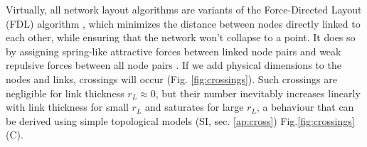\documentclass[nofootinbib,preprint,floatfix,endfloats]{revtex4} %
\begin{document}
Virtually, all network layout algorithms are variants of the Force-Directed Layout (FDL) algorithm \cite{kamada1989algorithm,davidson1996drawing,fruchterman1991graph,barnes1986hierarchical}, which minimizes the distance between nodes directly linked to each other, while ensuring that the network won't collapse to a point. 
It does so by assigning spring-like attractive forces between linked node pairs and weak repulsive forces between all node pairs %
 \cite{kabourov2015spring}.
If we add physical dimensions to the nodes and links, crossings will occur (Fig. \ref{fig:crossings}). Such crossings are negligible for link thickness $r_L\approx 0$, but their number inevitably increases 
linearly with link thickness for small $r_L$ and saturates for large $r_L$, a behaviour  that can be derived using simple topological models (SI, sec. \ref{ap:cross})
Fig.\ref{fig:crossings} (C).%
\end{document}
